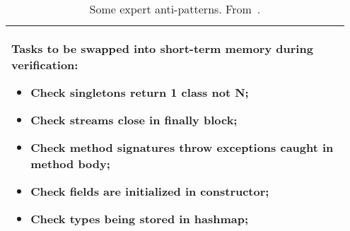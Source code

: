 
\begin{wraptable}{r}{0.45\textwidth}
\footnotesize
\centering
\begin{tabular}{|p{0.95\linewidth}|}
\hline
Tasks to be swapped into short-term memory during verification:
\begin{itemize}[leftmargin=*]
  \item Check   singletons return 1 class not N;
  \item Check   streams close in finally block;  
  \item Check  method signatures throw exceptions  caught in method body;
  \item Check   fields are  initialized in constructor;  
  \item Check types being stored in hashmap;
\end{itemize}\\\hline
\end{tabular}
\caption{ Some expert anti-patterns. From~\cite{Jo17}.}
\label{tab:expert_knowledge}
\end{wraptable}
